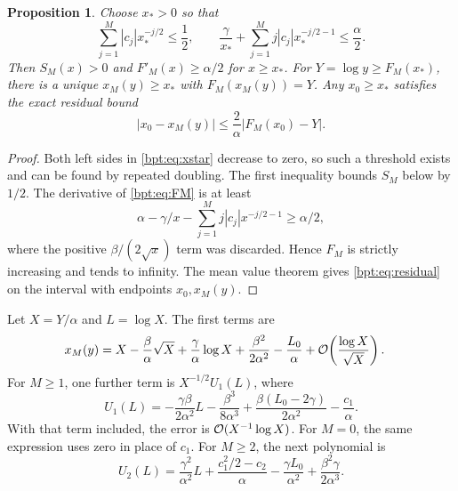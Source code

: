 \documentclass[11pt]{article}
\newtheorem{proposition}[theorem]{Proposition}
\theoremstyle{remark}\newtheorem{remark}[theorem]{Remark}
\begin{document}
\begin{proposition}\label{bpt:prop:residual}
Choose $x_*>0$ so that
\begin{equation}\label{bpt:eq:xstar}
 \sum_{j=1}^M|c_j|x_*^{-j/2}\le\frac12,\qquad
 \frac\gamma{x_*}+\sum_{j=1}^Mj|c_j|x_*^{-j/2-1}\le\frac\alpha2.
\end{equation}
Then $S_M(x)>0$ and $F'_M(x)\ge\alpha/2$ for $x\ge x_*$.
For $Y=\log y\ge F_M(x_*)$, there is a unique $x_M(y)\ge x_*$ with
$F_M(x_M(y))=Y$. Any $x_0\ge x_*$ satisfies the exact residual bound
\begin{equation}\label{bpt:eq:residual}
 |x_0-x_M(y)|\le\frac2\alpha|F_M(x_0)-Y|.
\end{equation}
\end{proposition}
\begin{proof}
Both left sides in \eqref{bpt:eq:xstar} decrease to zero, so such a threshold exists and can be found by repeated doubling. The first inequality bounds $S_M$ below by $1/2$. The derivative of \eqref{bpt:eq:FM} is at least
\[
 \alpha-\gamma/x-\sum_{j=1}^Mj|c_j|x^{-j/2-1}\ge\alpha/2,
\]
where the positive $\beta/(2\sqrt x)$ term was discarded. Hence $F_M$ is strictly increasing and tends to infinity. The mean value theorem gives \eqref{bpt:eq:residual} on the interval with endpoints $x_0,x_M(y)$.
\end{proof}

Let $X=Y/\alpha$ and $L=\log X$. The first terms are
\begin{align}\label{bpt:eq:inverse0}
 x_M(y)={}&X-\frac\beta\alpha\sqrt X+\frac\gamma\alpha\log X
       +\frac{\beta^2}{2\alpha^2}-\frac{L_0}\alpha
       +\mathcal O\!\left(\frac{\log X}{\sqrt X}\right).
\end{align}
For $M\ge1$, one further term is $X^{-1/2}U_1(L)$, where
\begin{equation}\label{bpt:eq:U1}
 U_1(L)=-\frac{\gamma\beta}{2\alpha^2}L
         -\frac{\beta^3}{8\alpha^3}
         +\frac{\beta(L_0-2\gamma)}{2\alpha^2}
         -\frac{c_1}\alpha.
\end{equation}
With that term included, the error is $\mathcal O(X^{-1}\log X)$.
For $M=0$, the same expression uses zero in place of $c_1$.
For $M\ge2$, the next polynomial is
\begin{equation}\label{bpt:eq:U2}
 U_2(L)=\frac{\gamma^2}{\alpha^2}L+\frac{c_1^2/2-c_2}{\alpha}
       -\frac{\gamma L_0}{\alpha^2}+\frac{\beta^2\gamma}{2\alpha^3}.
\end{equation}
\end{document}
